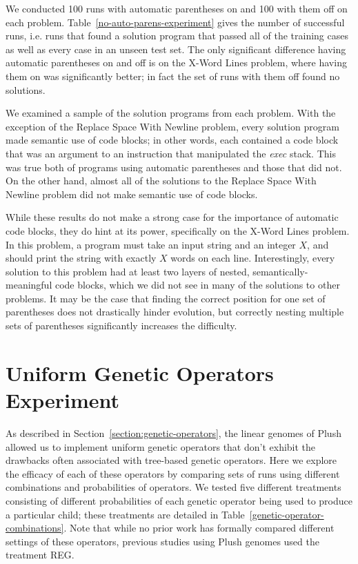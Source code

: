 \documentclass[graybox]{svmult}
\begin{document}
We conducted 100 runs with automatic parentheses on and 100 with them off on each problem. Table~\ref{no-auto-parens-experiment} gives the number of successful runs, i.e. runs that found a solution program that passed all of the training cases as well as every case in an unseen test set. The only significant difference having automatic parentheses on and off is on the X-Word Lines problem, where having them on was significantly better; in fact the set of runs with them off found no solutions.

We examined a sample of the solution programs from each problem. With the exception of the Replace Space With Newline problem, every solution program made semantic use of code blocks; in other words, each contained a code block that was an argument to an instruction that manipulated the \textit{exec} stack. This was true both of programs using automatic parentheses and those that did not. On the other hand, almost all of the solutions to the Replace Space With Newline problem did not make semantic use of code blocks.

While these results do not make a strong case for the importance of automatic code blocks, they do hint at its power, specifically on the X-Word Lines problem. In this problem, a program must take an input string and an integer $X$, and should print the string with exactly $X$ words on each line. Interestingly, every solution to this problem had at least two layers of nested, semantically-meaningful code blocks, which we did not see in many of the solutions to other problems. It may be the case that finding the correct position for one set of parentheses does not drastically hinder evolution, but correctly nesting multiple sets of parentheses significantly increases the difficulty.


\section{Uniform Genetic Operators Experiment}

As described in Section~\ref{section:genetic-operators}, the linear genomes of Plush allowed us to implement uniform genetic operators that don't exhibit the 
drawbacks often associated with tree-based genetic operators. Here we explore the efficacy of each of these operators by comparing sets of runs using different combinations and probabilities of operators. We tested five different treatments consisting of different probabilities of each genetic operator being used to produce a particular child; these treatments are detailed in Table~\ref{genetic-operator-combinations}. Note that while no prior work has formally compared different settings of these operators, previous studies using Plush genomes \cite{Helmuth:2015:GECCO, Helmuth:2015:GPTP, McPhee:2015:GPTP} used the treatment REG.
\end{document}
